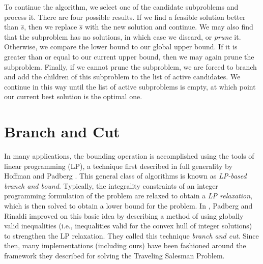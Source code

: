 To continue the algorithm, we select one of the candidate subproblems
and process it. There are four possible results. If we find a feasible
solution better than $\hat{s}$, then we replace $\hat{s}$ with the new
solution and continue. We may also find that the subproblem has no
solutions, in which case we discard, or {\em prune} it. Otherwise, we
compare the lower bound to our global upper bound. If it is greater
than or equal to our current upper bound, then we may again prune the
subproblem. Finally, if we cannot prune the subproblem, we are forced
to branch and add the children of this subproblem to the list of
active candidates. We continue in this way until the list of active
subproblems is empty, at which point our current best solution is the
optimal one.

\section{Branch and Cut}
\label{branchandcut}

In many applications, the bounding operation is accomplished using the
tools of linear programming (LP), a technique first described in full
generality by Hoffman and Padberg \cite{hoff:LP}. This general class of
algorithms is known as {\em LP-based branch and bound}. Typically, the
integrality constraints of an integer programming formulation of the
problem are relaxed to obtain a {\em LP relaxation}, which is then
solved to obtain a lower bound for the problem. In \cite{padb:branc},
Padberg and Rinaldi improved on this basic idea by describing a method
of using globally valid inequalities (i.e., inequalities valid for the
convex hull of integer solutions) to strengthen the LP relaxation.
They called this technique {\em branch and cut}. Since then, many
implementations (including ours) have been fashioned around the
framework they described for solving the Traveling Salesman Problem.

